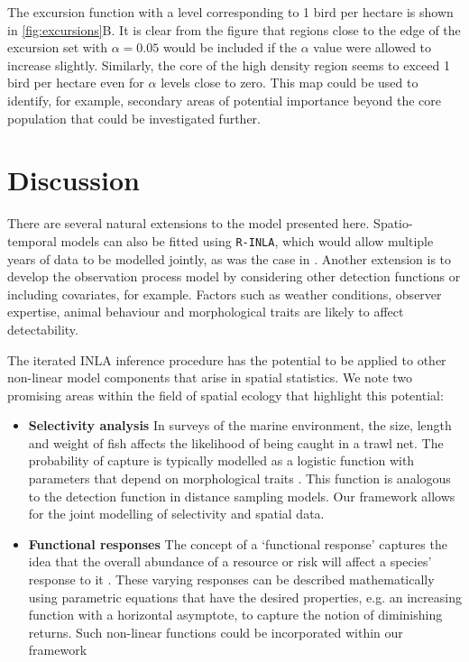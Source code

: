 \documentclass{statsoc}
\begin{document}
The excursion function with a level corresponding to 1 bird per hectare is shown in \autoref{fig:excursions}B.  It is clear from the figure that regions close to the edge of the excursion set with $\alpha = 0.05$ would be included if the $\alpha$ value were allowed to increase slightly.  Similarly, the core of the high density region seems to exceed 1 bird per hectare even for $\alpha$ levels close to zero. This map could be used to identify, for example, secondary areas of potential importance beyond the core population that could be investigated further.

\section{Discussion}
\label{sec-discussion}

There are several natural extensions to the model presented here.  Spatio-temporal models can also be fitted using \texttt{R-INLA}, which would allow multiple years of data to be modelled jointly, as was the case in \cite{camp_dsm_2020}.  Another extension is to develop the observation process model by considering other detection functions or including covariates, for example.  Factors such as weather conditions, observer expertise, animal behaviour and morphological traits are likely to affect detectability.

The iterated INLA inference procedure has the potential to be applied to other non-linear model components that arise in spatial statistics.  We note two promising areas within the field of spatial ecology that highlight this potential: 

\begin{itemize}
	\item \textbf{Selectivity analysis} In surveys of the marine environment, the size, length and weight of fish affects the likelihood of being caught in a trawl net.  The probability of capture is typically modelled as a logistic function with parameters that depend on morphological traits \citep{herrmann_understanding_2016, madsen_selectivity_2007, galbraith_demersal_1994}.  This function is analogous to the detection function in distance sampling models.  Our framework allows for the joint modelling of selectivity and spatial data.
	\item \textbf{Functional responses} The concept of a `functional response' captures the idea that the overall abundance of a resource or risk will affect a species' response to it \citep{holling_some_1959}.  These varying responses can be described mathematically using parametric equations that have the desired properties, e.g. an increasing function with a horizontal asymptote, to capture the notion of diminishing returns.  Such non-linear functions could be incorporated within our framework
\end{itemize}
\end{document}
